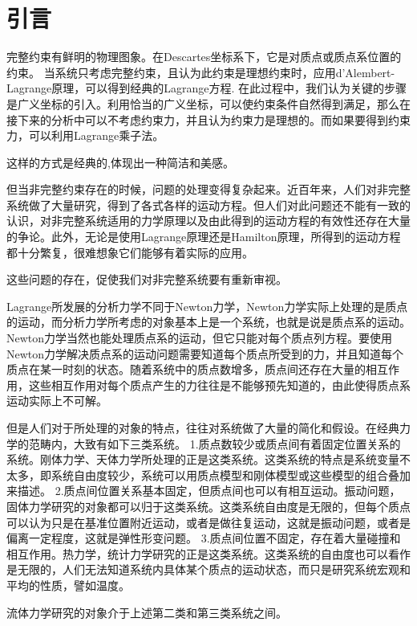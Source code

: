 \documentclass{ctexart}
\begin{document}
\section{引言}
\label{sec:intr}

完整约束有鲜明的物理图象。在Descartes坐标系下，它是对质点或质点系位置的约束。
当系统只考虑完整约束，且认为此约束是理想约束时，应用d'Alembert-Lagrange原理，可以得到经典的Lagrange方程.
在此过程中，我们认为关键的步骤是广义坐标的引入。利用恰当的广义坐标，可以使约束条件自然得到满足，那么在接下来的分析中可以不考虑约束力，并且认为约束力是理想的。而如果要得到约束力，可以利用Lagrange乘子法。

这样的方式是经典的,体现出一种简洁和美感。

但当非完整约束存在的时候，问题的处理变得复杂起来。近百年来，人们对非完整系统做了大量研究，得到了各式各样的运动方程。但人们对此问题还不能有一致的认识，对非完整系统适用的力学原理以及由此得到的运动方程的有效性还存在大量的争论。此外，无论是使用Lagrange原理还是Hamilton原理，所得到的运动方程都十分繁复，很难想象它们能够有着实际的应用。

这些问题的存在，促使我们对非完整系统要有重新审视。

Lagrange所发展的分析力学不同于Newton力学，Newton力学实际上处理的是质点的运动，而分析力学所考虑的对象基本上是一个系统，也就是说是质点系的运动。Newton力学当然也能处理质点系的运动，但它只能对每个质点列方程。要使用Newton力学解决质点系的运动问题需要知道每个质点所受到的力，并且知道每个质点在某一时刻的状态。随着系统中的质点数增多，质点间还存在大量的相互作用，这些相互作用对每个质点产生的力往往是不能够预先知道的，由此使得质点系运动实际上不可解。

但是人们对于所处理的对象的特点，往往对系统做了大量的简化和假设。在经典力学的范畴内，大致有如下三类系统。
1.质点数较少或质点间有着固定位置关系的系统。刚体力学、天体力学所处理的正是这类系统。这类系统的特点是系统变量不太多，即系统自由度较少，系统可以用质点模型和刚体模型或这些模型的组合叠加来描述。
2.质点间位置关系基本固定，但质点间也可以有相互运动。振动问题，固体力学研究的对象都可以归于这类系统。这类系统自由度是无限的，但每个质点可以认为只是在基准位置附近运动，或者是做往复运动，这就是振动问题，或者是偏离一定程度，这就是弹性形变问题。
3.质点间位置不固定，存在着大量碰撞和相互作用。热力学，统计力学研究的正是这类系统。这类系统的自由度也可以看作是无限的，人们无法知道系统内具体某个质点的运动状态，而只是研究系统宏观和平均的性质，譬如温度。

流体力学研究的对象介于上述第二类和第三类系统之间。
\end{document}
